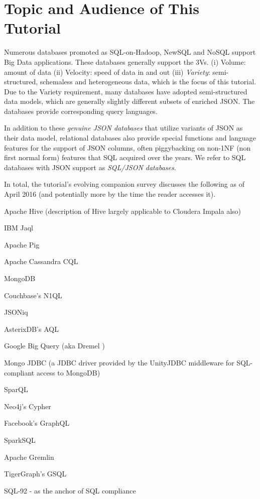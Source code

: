 
\section{Topic and Audience of This Tutorial}
Numerous databases promoted as SQL-on-Hadoop, NewSQL and NoSQL support Big Data applications. These databases generally support the 3Vs.%
(i) Volume: amount of data (ii) Velocity: speed of data in and out (iii) \emph{Variety}: semi-structured, schemaless and heterogeneous data, which is the focus of this tutorial. Due to the Variety requirement, many databases have adopted semi-structured data models, which are generally slightly different subsets of enriched JSON. The databases provide corresponding query languages. 

In addition to these {\em genuine JSON databases} that utilize variants of JSON as their data model, relational databases also provide special functions and language features for the support of JSON columns, often piggybacking on non-1NF (non first normal form) features that SQL acquired over the years. We refer to SQL databases with JSON support as {\em SQL/JSON databases}. 

In total, the tutorial's evolving companion survey 
discusses the following as of April 2016 (and potentially more by the time the reader accesses it).

\begin{compact_enum}
\item Apache Hive \cite{hive-icde-2010} (description of Hive largely applicable to Cloudera Impala \cite{impala} also)
\item IBM Jaql \cite{jaql-pvldb-2011}
\item Apache Pig \cite{pig-sigmod-2008}
\item Apache Cassandra CQL \cite{cassandra-osr-2010}
\item MongoDB \cite{mongodb}
\item Couchbase's N1QL \cite{couchbase,couchbase-sigmod-2016}
\item JSONiq \cite{jsoniq-ieee-ic-2013}
\item AsterixDB's AQL \cite{asterixdb-dpd-2011-all-authors}
\item Google Big Query (aka Dremel \cite{dremel-pvldb-2010})
\item Mongo JDBC \cite{unityjdbc} (a JDBC driver provided by the UnityJDBC middleware for SQL-compliant access to MongoDB)
\item {}
\item SparQL \cite{sparql}
\item Neo4j's Cypher \cite{cypher}
\item Facebook's GraphQL \cite{graphql}
\item SparkSQL \cite{sparksql}
\item Apache Gremlin \cite{gremlin}
\item TigerGraph's GSQL \cite{gsql}
\item SQL-92 - as the anchor of SQL compliance
\end{compact_enum}



